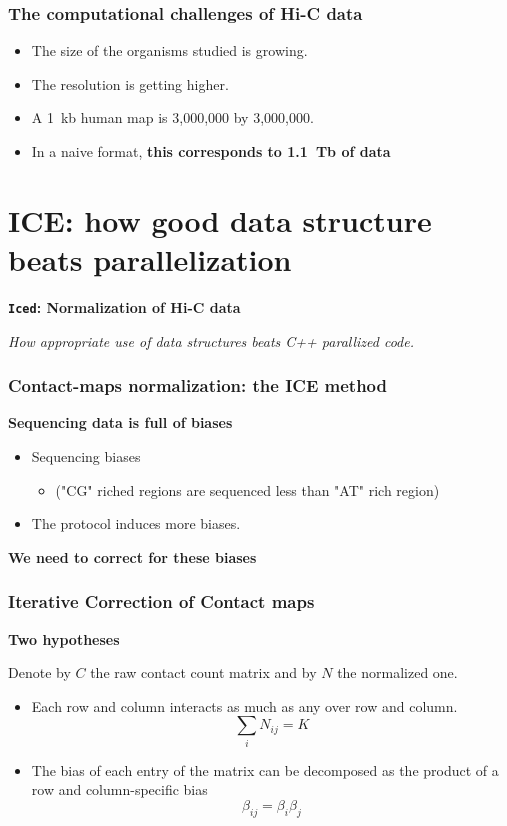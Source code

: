 \documentclass[xcolor=dvipsnames]{beamer}
\begin{document}
\begin{frame}
\frametitle{The computational challenges of Hi-C data}
\begin{itemize}[label={$\bullet$}]
\item The size of the organisms studied is growing.
\item The resolution is getting higher.
\item A 1~kb human map is 3,000,000 by 3,000,000.
\item In a naive format, {\bf this corresponds to 1.1~Tb of data}
\end{itemize}
\end{frame}


\section{ICE: how good data structure beats parallelization}
\begin{frame}
\Large{ \bf
\texttt{Iced}: Normalization of Hi-C data}

\begin{flushright}
\vspace{1em}
\small
\textit{How appropriate use of data structures beats C++ parallized code.}
\end{flushright}
\end{frame}

\begin{frame}
\frametitle{Contact-maps normalization: the ICE method}

{\bf \color{Blue} Sequencing data is full of biases}

\begin{itemize}[label={$\bullet$}]
\item Sequencing biases
\begin{itemize}
\item ("CG" riched regions are sequenced less than "AT" rich region)
\end{itemize}
\item The protocol induces more biases.
\end{itemize}
\vspace{3em}

\begin{center}
{\bf \color{Blue} We need to correct for these biases}
\end{center}

\end{frame}


\begin{frame}
\frametitle{Iterative Correction of Contact maps}
{\bf \color{Blue} Two hypotheses}

Denote by $C$ the raw contact count matrix and by $N$ the normalized one.

\begin{itemize}[label={$\bullet$}]
\item Each row and column interacts as much as any over row and column.
$$
\sum_{i} N_{ij} = K
$$
\item The bias of each entry of the matrix can be decomposed as the product of
a row and column-specific bias
$$
\beta_{ij} = \beta_i \beta_j
$$
\end{itemize}
\end{frame}
\end{document}
